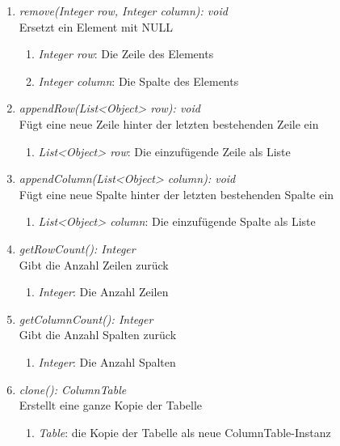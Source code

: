 \begin{enumerate}[+]
	\item \textit{remove(Integer row, Integer column): void} \\
	Ersetzt ein Element mit NULL
	\begin{enumerate}[$\bullet$]
		\item \textit{Integer row}: Die Zeile des Elements
		\item \textit{Integer column}: Die Spalte des Elements
	\end{enumerate}
	\vspace{-0.2cm}
	
	\item \textit{appendRow(List<Object> row): void} \\
	Fügt eine neue Zeile hinter der letzten bestehenden Zeile ein
	\begin{enumerate}[$\bullet$]
		\item \textit{List<Object> row}: Die einzufügende Zeile als Liste
	\end{enumerate}
	\vspace{-0.2cm}
	
	\item \textit{appendColumn(List<Object> column): void} \\
	Fügt eine neue Spalte hinter der letzten bestehenden Spalte ein
	\begin{enumerate}[$\bullet$]
		\item \textit{List<Object> column}: Die einzufügende Spalte als Liste
	\end{enumerate}
	\vspace{-0.2cm}
	
	\item \textit{getRowCount(): Integer} \\
	Gibt die Anzahl Zeilen zurück
	\vspace{-0.2cm}
	\begin{enumerate}[$\circ$]
		\item \textit{Integer}: Die Anzahl Zeilen
	\end{enumerate}
	
	\item \textit{getColumnCount(): Integer} \\
	Gibt die Anzahl Spalten zurück
	\vspace{-0.2cm}
	\begin{enumerate}[$\circ$]
		\item \textit{Integer}: Die Anzahl Spalten
	\end{enumerate}
	
	\item \textit{clone(): ColumnTable} \\
	Erstellt eine ganze Kopie der Tabelle
	\vspace{-0.2cm}
	\begin{enumerate}[$\circ$]
		\item \textit{Table}: die Kopie der Tabelle als neue ColumnTable-Instanz
	\end{enumerate}
	

\end{enumerate}
